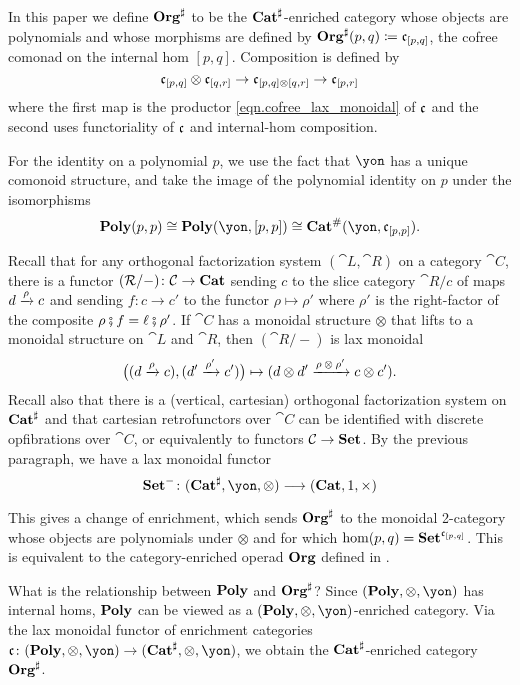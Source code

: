 In this paper we define $\mathbf{Org}^\sharp$ to be the $\mathbf{Cat}^\sharp$-enriched category whose objects are polynomials and whose morphisms are defined by $\mathbf{Org}^\sharp(p, q) \coloneqq \mathfrak{c}_{[p,q]}$, the cofree comonad on the internal hom $[p,q]$. 
Composition is defined by 
\[
    \mathfrak{c}_{[p,q]} \otimes \mathfrak{c}_{[q,r]} \to \mathfrak{c}_{[p, q] \otimes [q, r]} \to \mathfrak{c}_{[p, r]}
\]
where the first map is the productor \eqref{eqn.cofree_lax_monoidal} of $\mathfrak{c}$ and the second uses functoriality of $\mathfrak{c}$ and internal-hom composition.

For the identity on a polynomial $p$, we use the fact that $\yon$ has a unique comonoid structure, and take the image of the polynomial identity on $p$ under the isomorphisms
\[
    \poly(p, p) \iso \poly(\yon , [p, p]) \iso \smcat^\#(\yon, \cofree_{[p,p]}).
\]

Recall that for any orthogonal factorization system $(\cat{L},\cat{R})$ on a category $\cat{C}$, there is a functor $(\mathcal{R}/-)\colon\mathcal{C}\to\mathbf{Cat}$ sending $c$ to the slice category $\cat{R}/c$ of maps $d\xrightarrow[]{\textnormal{$\rho$}}c$ and sending $f\colon c\to c'$ to the functor $\rho\mapsto\rho'$ where $\rho'$ is the right-factor of the composite $\rho\mathbin{\fatsemi} f=\ell\mathbin{\fatsemi}\rho'$. If $\cat{C}$ has a monoidal structure $\otimes$ that lifts to a monoidal structure on $\cat{L}$ and $\cat{R}$, then $(\cat{R}/-)$ is lax monoidal
\[
\big((d\xrightarrow[]{\textnormal{$\rho$}}c), (d'\xrightarrow[]{\textnormal{$\rho'$}}c')\big)\mapsto (d\otimes d'\xrightarrow[]{\textnormal{$\rho\otimes\rho'$}}c\otimes c').\]
Recall also \cite[Proposition 5.52]{niu2022poly} that there is a (vertical, cartesian) orthogonal factorization system on $\mathbf{Cat}^\sharp$ and that cartesian retrofunctors over $\cat{C}$ can be identified with discrete opfibrations over $\cat{C}$, or equivalently to functors $\mathcal{C}\to\mathbf{Set}$. By the previous paragraph, we have a lax monoidal functor
\[
\smset^-\colon(\smcat^\sharp,\yon,\otimes)\too(\smcat,1,\times)
\]

This gives a change of enrichment, which sends $\mathbf{Org}^\sharp$ to the monoidal 2-category whose objects are polynomials under $\otimes$ and for which $\hom(p,q)=\mathbf{Set}^{\mathfrak{c}_{[p,q]}}$. This is equivalent to the category-enriched operad $\mathbf{Org}$ defined in \cite[Definition 2.19]{spivak2021learnersv1}.

\begin{remark}
    What is the relationship between $\mathbf{Poly}$ and $\mathbf{Org}^\sharp$? Since $(\poly, \otimes, \yon)$ has internal homs, $\mathbf{Poly}$ can be viewed as a $(\poly, \otimes, \yon)$-enriched category. Via the lax monoidal functor of enrichment categories $\cofree\colon (\poly, \otimes, \yon) \to (\smcat^\sharp, \otimes, \yon)$, we obtain the $\mathbf{Cat}^\sharp$-enriched category $\mathbf{Org}^\sharp$.
\end{remark}

